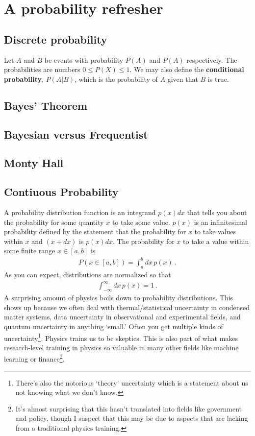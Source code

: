 \chapter{A probability refresher}

\section{Discrete probability}

Let $A$ and $B$ be events with probability $P(A)$ and $P(A)$ respectively. The probabilities are numbers $0\leq P(X) \leq 1$. We may also define the \textbf{conditional probability}, $P(A|B)$, which is the probability of $A$ given that $B$ is true. 

\section{Bayes' Theorem}

\section{Bayesian versus Frequentist}

\section{Monty Hall}


\section{Contiuous Probability}

A probability distribution function is an integrand $p(x)dx$ that tells you about the probability for some quantity $x$ to take some value. $p(x)$ is an infinitesimal probability defined by the statement that the probability for $x$ to take values within $x$ and $(x+dx)$ is $p(x)dx$. The probability for $x$ to take a value within some finite range $x\in[a,b]$ is
\begin{align}
	P(x\in[a,b]) = \int_a^b dx\, p(x) \ .
\end{align}
As you can expect, distributions are normalized so that
\begin{align}
	\int_{-\infty}^{\infty} dx\, p(x) = 1 \ .
\end{align}
A surprising amount of physics boils down to probability distributions. This shows up because we often deal with thermal/statistical uncertainty in condensed matter systems, data uncertainty in observational and experimental fields, and quantum uncertainty in anything `small.' Often you get multiple kinds of uncertainty\footnote{There's also the notorious `theory' uncertainty which is a statement about us not knowing what we don't know.}. Physics trains us to be skeptics. This is also part of what makes research-level training in physics so valuable in many other fields like machine learning or finance\footnote{It's almost surprising that this hasn't translated into fields like government and policy, though I suspect that this may be due to aspects that are lacking from a traditional physics training.}.

